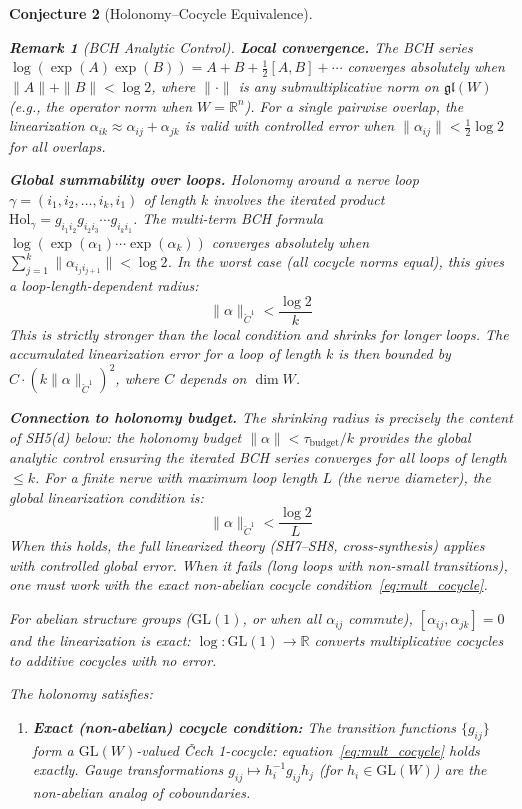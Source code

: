 \documentclass[11pt,letterpaper]{article}
\newtheorem{conjecture}{Conjecture}[section]
\newtheorem{remark}[conjecture]{Remark}
\newcommand{\Hol}{\mathrm{Hol}}
\newcommand{\tbudget}{\tau_{\mathrm{budget}}}
\newcommand{\Cech}{\check{C}}
\begin{document}
\begin{conjecture}[Holonomy--Cocycle 
Equivalence]
\begin{remark}[BCH Analytic Control]\label{rem:bch_control}
\textbf{Local convergence.} 
The BCH series $\log(\exp(A)\exp(B)) = A + B + \tfrac{1}{2}[A,B] + 
\cdots$ converges absolutely when $\|A\| + \|B\| < \log 2$, where 
$\|\cdot\|$ is any submultiplicative norm on $\mathfrak{gl}(W)$ 
(e.g., the operator norm when $W = \mathbb{R}^n$). For a single 
pairwise overlap, the linearization 
$\alpha_{ik} \approx \alpha_{ij} + \alpha_{jk}$ is valid with 
controlled error when 
$\|\alpha_{ij}\| < \tfrac{1}{2}\log 2$ for all overlaps.

\textbf{Global summability over loops.}
Holonomy around a nerve loop $\gamma = (i_1, i_2, \ldots, i_k, i_1)$ 
of length $k$ involves the iterated product 
$\Hol_\gamma = g_{i_1 i_2} g_{i_2 i_3} \cdots g_{i_k i_1}$. The 
multi-term BCH formula 
$\log(\exp(\alpha_1) \cdots \exp(\alpha_k))$ converges absolutely 
when $\sum_{j=1}^{k} \|\alpha_{i_j i_{j+1}}\| < \log 2$. In the 
worst case (all cocycle norms equal), this gives a 
\emph{loop-length-dependent radius}:
\[
    \|\alpha\|_{\Cech^1} < \frac{\log 2}{k}
\]
This is strictly stronger than the local condition and 
\emph{shrinks} for longer loops. The accumulated linearization error 
for a loop of length $k$ is then bounded by 
$C \cdot (k \|\alpha\|_{\Cech^1})^2$, where $C$ depends on $\dim W$.

\textbf{Connection to holonomy budget.}
The shrinking radius is precisely the content of SH5(d) below: the 
holonomy budget $\|\alpha\| < \tbudget / k$ provides the global 
analytic control ensuring the iterated BCH series converges for all 
loops of length $\leq k$. For a finite nerve with maximum loop 
length $L$ (the nerve diameter), the \emph{global linearization 
condition} is:
\[
    \|\alpha\|_{\Cech^1} < \frac{\log 2}{L}
\]
When this holds, the full linearized theory (SH7--SH8, cross-synthesis) 
applies with controlled global error. When it fails (long loops with 
non-small transitions), one must work with the exact non-abelian 
cocycle condition~\eqref{eq:mult_cocycle}.
\end{remark}

For abelian 
structure groups ($\mathrm{GL}(1)$, or when all $\alpha_{ij}$ 
commute), $[\alpha_{ij}, \alpha_{jk}] = 0$ and the linearization 
is exact: $\log : \mathrm{GL}(1) \to \mathbb{R}$ converts 
multiplicative cocycles to additive cocycles with no error.

The holonomy satisfies:

\begin{enumerate}[label=(\alph*)]
    \item \textbf{Exact (non-abelian) cocycle condition:} The 
    transition functions $\{g_{ij}\}$ form a $\mathrm{GL}(W)$-valued 
    \v{C}ech 1-cocycle: equation~\eqref{eq:mult_cocycle} holds 
    exactly. Gauge transformations $g_{ij} \mapsto h_i^{-1} g_{ij} 
    h_j$ (for $h_i \in \mathrm{GL}(W)$) are the non-abelian analog 
    of coboundaries.
    

\end{enumerate}
\end{conjecture}
\end{document}
